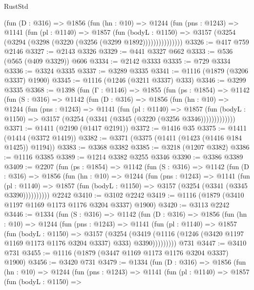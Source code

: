 \begin{lexlean}{RustStd}
\begin{coremodule}
            (fun (D : @316) =>
            @1856
              (fun (hn : @10) =>
              @1244
                (fun (pns : @1243) =>
                @1141
                  (fun (pl : @1140) =>
                  @1857
                    (fun (bodyL : @1150) =>
                    @3157 (@3254 (@3294 (@3298 (@3220 (@3256 (@3299 @1892)))))))))))))))
@3326 := @417 @759 @2146
@3327 := @2143 @3326
@3329 := @441 @3327 @662
@3333 := @536 (@565 (@409 @3329)) @606
@3334 := @2142 @3333
@3335 := @729 @3334
@3336 := @3324 @3335
@3337 := @3289 @3335
@3341 := @1116 (@1879 (@3206 @3337) @1900)
@3345 := @1116 (@1246 (@3211 @3337) @333)
@3346 := @3299 @3335
@3368 := @1398
    (fun (Γ : @1146) =>
    @1855
      (fun (ps : @1854) =>
      @1142
        (fun (S : @316) =>
        @1142
          (fun (D : @316) =>
          @1856
            (fun (hn : @10) =>
            @1244
              (fun (pns : @1243) =>
              @1141
                (fun (pl : @1140) =>
                @1857
                  (fun (bodyL : @1150) =>
                  @3157 (@3254 (@3341 (@3345 (@3220 (@3256 @3346)))))))))))))
@3371 := @1411 (@2190 (@1417 @2191))
@3372 := @1416 @35
@3375 := @1411 (@1414 (@3372 @1419))
@3382 := @3371 (@3375 (@1411 (@1423 (@1416 @184 @1425)) @1194))
@3383 := @3368 @3382
@3385 := @3218 (@1207 @3382)
@3386 := @1116 @3385
@3389 := @1214 @3382 @3255 @3346
@3390 := @3386 @3389
@3409 := @2207
    (fun (ps : @1854) =>
    @1142
      (fun (S : @316) =>
      @1142
        (fun (D : @316) =>
        @1856
          (fun (hn : @10) =>
          @1244
            (fun (pns : @1243) =>
            @1141
              (fun (pl : @1140) =>
              @1857 (fun (bodyL : @1150) => @3157 (@3254 (@3341 (@3345 @3390))))))))))
    @2242
@3410 := @3102 @2242
@3419 := @1116 (@1879 (@3410 @1197 @1169 @1173 @1176 @3204 @3337) @1900)
@3420 := @3113 @2242
@3446 := @1334
    (fun (S : @316) =>
    @1142
      (fun (D : @316) =>
      @1856
        (fun (hn : @10) =>
        @1244
          (fun (pns : @1243) =>
          @1141
            (fun (pl : @1140) =>
            @1857
              (fun (bodyL : @1150) =>
              @3157
                (@3254
                  (@3419
                    (@1116 (@1246 (@3420 @1197 @1169 @1173 @1176 @3204 @3337) @333) @3390)))))))))
    @731
@3447 := @3410 @731
@3455 := @1116 (@1879 (@3447 @1169 @1173 @1176 @3204 @3337) @1900)
@3456 := @3420 @731
@3479 := @1334
    (fun (D : @316) =>
    @1856
      (fun (hn : @10) =>
      @1244
        (fun (pns : @1243) =>
        @1141
          (fun (pl : @1140) =>
          @1857
            (fun (bodyL : @1150) =>

\end{coremodule}
\end{lexlean}
